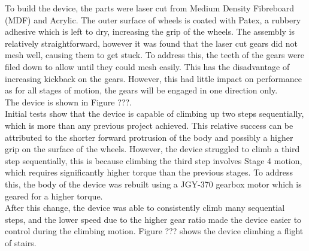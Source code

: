 To build the device, the parts were laser cut from Medium Density Fibreboard (MDF) and Acrylic. The outer surface of wheels is coated with Patex, a rubbery adhesive which is left to dry, increasing the grip of the wheels. The assembly is relatively straightforward, however it was found that the laser cut gears did not mesh well, causing them to get stuck. To address this, the teeth of the gears were filed down to allow until they could mesh easily. This has the disadvantage of increasing kickback on the gears. However, this had little impact on performance as for all stages of motion, the gears will be engaged in one direction only.\\
The device is shown in Figure ???.
\\
Initial tests show that the device is capable of climbing up two steps sequentially, which is more than any previous project achieved. This relative success can be attributed to the shorter forward protrusion of the body and possibly a higher grip on the surface of the wheels. However, the device struggled to climb a third step sequentially, this is because climbing the third step involves Stage 4 motion, which requires significantly higher torque than the previous stages. To address this, the body of the device was rebuilt using a JGY-370 gearbox motor which is geared for a higher torque. \\
After this change, the device was able to consistently climb many sequential steps, and the lower speed due to the higher gear ratio made the device easier to control during the climbing motion. Figure ??? shows the device climbing a flight of stairs.

%
